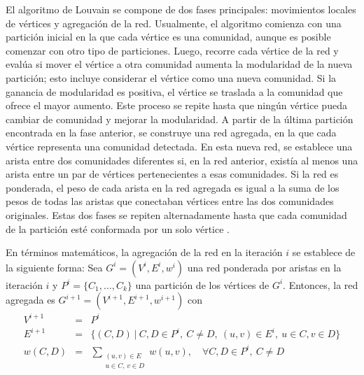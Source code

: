 El algoritmo de Louvain se compone de dos fases principales: movimientos locales de vértices y agregación de la red. Usualmente, el algoritmo comienza con una partición inicial en la que cada vértice es una comunidad, aunque es posible comenzar con otro tipo de particiones. Luego, recorre cada vértice de la red y evalúa si mover el vértice a otra comunidad aumenta la modularidad de la nueva partición; esto incluye considerar el vértice como una nueva comunidad. Si la ganancia de modularidad es positiva, el vértice se traslada a la comunidad que ofrece el mayor aumento. Este proceso se repite hasta que ningún vértice pueda cambiar de comunidad y mejorar la modularidad. A partir de la última partición encontrada en la fase anterior, se construye una red agregada, en la que cada vértice representa una comunidad detectada. En esta nueva red, se establece una arista entre dos comunidades diferentes si, en la red anterior, existía al menos una arista entre un par de vértices pertenecientes a esas comunidades. Si la red es ponderada, el peso de cada arista en la red agregada es igual a la suma de los pesos de todas las aristas que conectaban vértices entre las dos comunidades originales. Estas dos fases se repiten alternadamente hasta que cada comunidad de la partición esté conformada por un solo vértice \parencite{Fortunato2010, Traag2019}.  

En términos matemáticos, la agregación de la red en la iteración $i$ se establece de la siguiente forma: Sea $G^{i}=(V^{i}, E^{i}, w^{i})$ una red ponderada por aristas en la iteración $i$ y $P^{i}=\{C_1, \ldots, C_k\}$ una partición de los vértices de $G^{i}$. Entonces,  la red agregada es $G^{i+1}=(V^{i+1}, E^{i+1}, w^{i+1})$ con
\begin{eqnarray}
V^{i+1} &=& P^i\\
E^{i+1} &=& \{(C, D) \ | \ C, D\in P^i, \ C\neq D, \ (u,v) \in E^{i}, \ u\in C, v\in D\}\\
w(C,D) &=& \sum_{\substack{(u,v)\in E\\ u\in C,\, v\in D}} w(u,v), \quad \forall C,D\in P^{i}, \ C\neq D
\end{eqnarray} 

